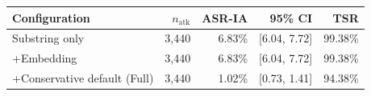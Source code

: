 \begin{tabular}{lrrrr}
\toprule
\textbf{Configuration} & $n_{\text{atk}}$ & \textbf{ASR-IA} & \textbf{95\% CI} & \textbf{TSR} \\
\midrule
Substring only & 3,440 & 6.83\% & [6.04, 7.72] & 99.38\% \\
+Embedding & 3,440 & 6.83\% & [6.04, 7.72] & 99.38\% \\
+Conservative default (Full) & 3,440 & 1.02\% & [0.73, 1.41] & 94.38\% \\
\bottomrule
\end{tabular}
